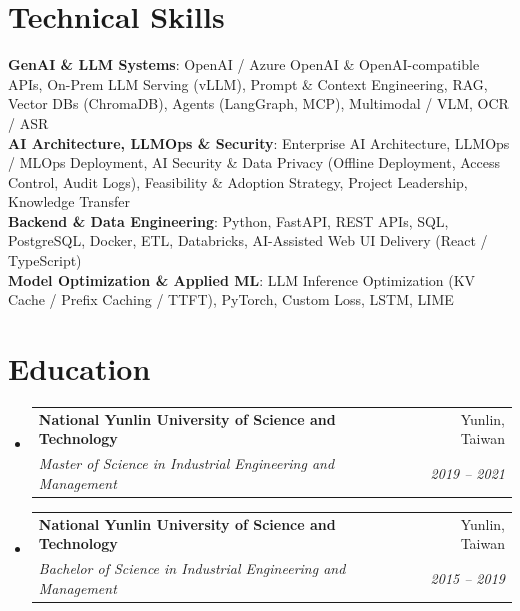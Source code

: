 \documentclass[letterpaper,10pt]{article}
\makeatletter
\newcommand{\resumeSubheading}[4]{
  \vspace{-2pt}\item
    \begin{tabular*}{0.97\textwidth}[t]{l@{\extracolsep{\fill}}r}
      \textbf{#1} & #2 \\
      \textit{\small#3} & \textit{\small #4} \\
    \end{tabular*}\vspace{-5pt}
}
\newcommand{\resumeSubHeadingListStart}{\begin{itemize}[leftmargin=0.15in, label={}, itemsep=0pt]}
\newcommand{\resumeSubHeadingListEnd}{\end{itemize}}
\makeatother
\begin{document}
\section{Technical Skills}
 \begin{itemize}[leftmargin=0.15in, label={}]
    \small{\item{
     \textbf{GenAI \& LLM Systems}{: OpenAI / Azure OpenAI \& OpenAI-compatible APIs, On-Prem LLM Serving (vLLM), Prompt \& Context Engineering, RAG, Vector DBs (ChromaDB), Agents (LangGraph, MCP), Multimodal / VLM, OCR / ASR} \\
     \textbf{AI Architecture, LLMOps \& Security}{: Enterprise AI Architecture, LLMOps / MLOps Deployment, AI Security \& Data Privacy (Offline Deployment, Access Control, Audit Logs), Feasibility \& Adoption Strategy, Project Leadership, Knowledge Transfer} \\
     \textbf{Backend \& Data Engineering}{: Python, FastAPI, REST APIs, SQL, PostgreSQL, Docker, ETL, Databricks, AI-Assisted Web UI Delivery (React / TypeScript)} \\
     \textbf{Model Optimization \& Applied ML}{: LLM Inference Optimization (KV Cache / Prefix Caching / TTFT), PyTorch, Custom Loss, LSTM, LIME}
    }}
 \end{itemize}

\section{Education}
  \resumeSubHeadingListStart
    \resumeSubheading
      {National Yunlin University of Science and Technology}{Yunlin, Taiwan}
      {Master of Science in Industrial Engineering and Management}{2019 -- 2021}
    \resumeSubheading
      {National Yunlin University of Science and Technology}{Yunlin, Taiwan}
      {Bachelor of Science in Industrial Engineering and Management}{2015 -- 2019}
  \resumeSubHeadingListEnd
\end{document}
